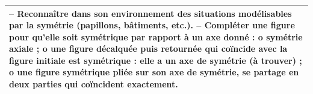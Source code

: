 \begin{center}
\begin{minipage}{16cm}
{\begin{tabular}{|p{14.9cm}|}
            -- Reconnaître dans son environnement des situations modélisables par la symétrie (papillons, bâtiments, etc.). \newline
            -- Compléter une figure pour qu'elle soit symétrique par rapport à un axe donné : \newline
            \hspace*{5mm} o symétrie axiale ; \newline
            \hspace*{5mm} o une figure décalquée puis retournée qui coïncide avec la figure initiale est symétrique : elle a un axe de symétrie (à trouver) ; \newline
            \hspace*{5mm} o une figure symétrique pliée sur son axe de symétrie, se partage en deux parties qui coïncident exactement. \\
            \hline
      \end{tabular}
   }
   \end{minipage}
\end{center}

\pagebreak


